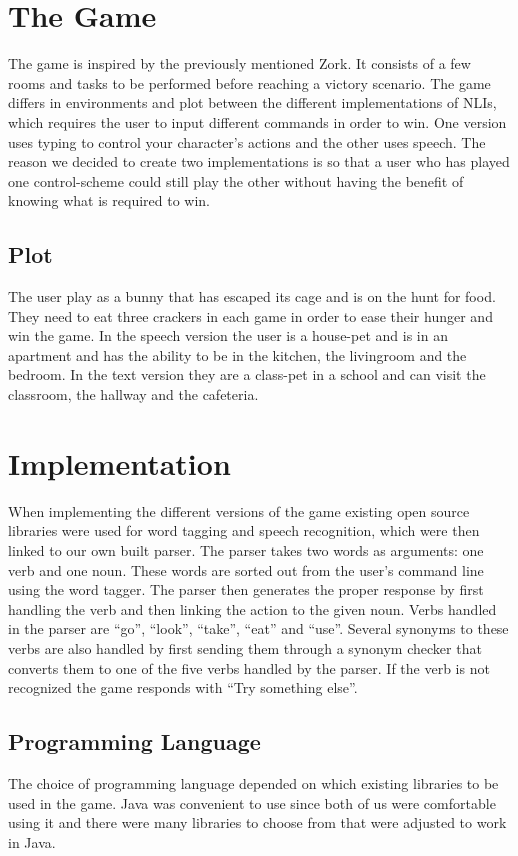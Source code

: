 \section{The Game}
The game is inspired by the previously mentioned Zork. It consists of a few rooms and tasks to be performed before reaching a victory scenario. The game differs in environments and plot between the different implementations of NLIs, which requires the user to input different commands in order to win. One version uses typing to control your character’s actions and the other uses speech. The reason we decided to create two implementations is so that a user who has played one control-scheme could still play the other without having the benefit of knowing what is required to win.

\subsection{Plot}
The user play as a bunny that has escaped its cage and is on the hunt for food. They need to eat three crackers in each game in order to ease their hunger and win the game. In the speech version the user is a house-pet and is in an apartment and has the ability to be in the kitchen, the livingroom and the bedroom. In the text version they are a class-pet in a school and can visit the classroom, the hallway and the cafeteria.

\section{Implementation}
When implementing the different versions of the game existing open source libraries were used for word tagging and speech recognition, which were then linked to our own built parser. The parser takes two words as arguments: one verb and one noun. These words are sorted out from the user's command line using the word tagger. The parser then generates the proper response by first handling the verb and then linking the action to the given noun. Verbs handled in the parser are ``go'', ``look'', ``take'', ``eat'' and ``use''. Several synonyms to these verbs are also handled by first sending them through a synonym checker that converts them to one of the five verbs handled by the parser. If the verb is not recognized the game responds with ``Try something else''.

\subsection{Programming Language}
The choice of programming language depended on which existing libraries to be used in the game. Java was convenient to use since both of us were comfortable using it and there were many libraries to choose from that were adjusted to work in Java.

